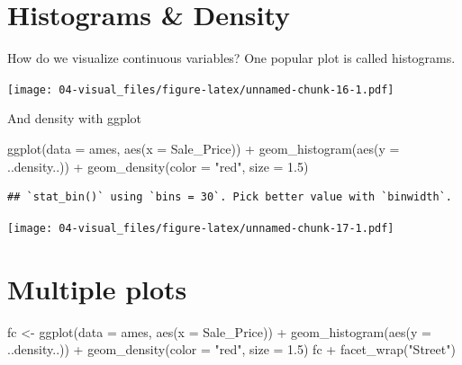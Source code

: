 \documentclass[
]{book}
\newenvironment{Shaded}{\begin{snugshade}}{\end{snugshade}}
\newcommand{\AttributeTok}[1]{\textcolor[rgb]{0.77,0.63,0.00}{#1}}
\newcommand{\FloatTok}[1]{\textcolor[rgb]{0.00,0.00,0.81}{#1}}
\newcommand{\FunctionTok}[1]{\textcolor[rgb]{0.00,0.00,0.00}{#1}}
\newcommand{\NormalTok}[1]{#1}
\newcommand{\OtherTok}[1]{\textcolor[rgb]{0.56,0.35,0.01}{#1}}
\newcommand{\SpecialCharTok}[1]{\textcolor[rgb]{0.00,0.00,0.00}{#1}}
\newcommand{\StringTok}[1]{\textcolor[rgb]{0.31,0.60,0.02}{#1}}
\begin{document}
\hypertarget{histograms-density}{%
\section{Histograms \& Density}\label{histograms-density}}

How do we visualize continuous variables? One popular plot is called histograms.

\begin{Shaded}
\end{Shaded}

\texttt{[image: 04-visual\_files/figure-latex/unnamed-chunk-16-1.pdf]}

And density with ggplot

\begin{Shaded}
\begin{Highlighting}[]
\FunctionTok{ggplot}\NormalTok{(}\AttributeTok{data =}\NormalTok{ ames, }\FunctionTok{aes}\NormalTok{(}\AttributeTok{x =}\NormalTok{ Sale\_Price)) }\SpecialCharTok{+}
  \FunctionTok{geom\_histogram}\NormalTok{(}\FunctionTok{aes}\NormalTok{(}\AttributeTok{y =}\NormalTok{ ..density..)) }\SpecialCharTok{+}
  \FunctionTok{geom\_density}\NormalTok{(}\AttributeTok{color =} \StringTok{"red"}\NormalTok{,}
               \AttributeTok{size =} \FloatTok{1.5}\NormalTok{)}
\end{Highlighting}
\end{Shaded}

\begin{verbatim}
## `stat_bin()` using `bins = 30`. Pick better value with `binwidth`.
\end{verbatim}

\texttt{[image: 04-visual\_files/figure-latex/unnamed-chunk-17-1.pdf]}

\hypertarget{multiple-plots}{%
\section{Multiple plots}\label{multiple-plots}}

\begin{Shaded}
\begin{Highlighting}[]
\NormalTok{fc }\OtherTok{\textless{}{-}} \FunctionTok{ggplot}\NormalTok{(}\AttributeTok{data =}\NormalTok{ ames, }\FunctionTok{aes}\NormalTok{(}\AttributeTok{x =}\NormalTok{ Sale\_Price)) }\SpecialCharTok{+}
  \FunctionTok{geom\_histogram}\NormalTok{(}\FunctionTok{aes}\NormalTok{(}\AttributeTok{y =}\NormalTok{ ..density..)) }\SpecialCharTok{+}
  \FunctionTok{geom\_density}\NormalTok{(}\AttributeTok{color =} \StringTok{"red"}\NormalTok{,}
               \AttributeTok{size =} \FloatTok{1.5}\NormalTok{)}
\NormalTok{fc }\SpecialCharTok{+} \FunctionTok{facet\_wrap}\NormalTok{(}\StringTok{"Street"}\NormalTok{)}
\end{Highlighting}
\end{Shaded}
\end{document}

